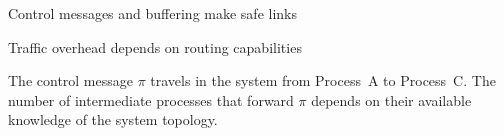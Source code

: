 \documentclass[10pt, xcolor={usenames, dvipsnames}]{beamer}
\begin{document}
\begin{frame}{Control messages and buffering make safe links}
\end{frame}


\begin{frame}{Traffic overhead depends on routing capabilities}
  
    \begin{center}
      
    \end{center}
  
  \vspace{1em}
  
  The control message $\pi$ travels in the system from Process~A to
  Process~C. The number of intermediate processes that forward $\pi$ depends on
  their available knowledge of the system topology.

  \vspace{1em}

  \begin{center}
    \begin{table}
      \begin{center}
        
      \end{center}
    \end{table}
  \end{center}


\end{frame}
\end{document}
